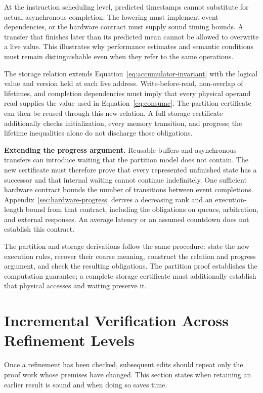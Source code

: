 \documentclass[11pt]{article}
\begin{document}
At the instruction scheduling level, predicted timestamps cannot substitute for actual asynchronous completion. The lowering must implement event dependencies, or the hardware contract must supply sound timing bounds. A transfer that finishes later than its predicted mean cannot be allowed to overwrite a live value. This illustrates why performance estimates and semantic conditions must remain distinguishable even when they refer to the same operations.

The storage relation extends Equation~\ref{eq:accumulator-invariant} with the logical value and version held at each live address. Write-before-read, non-overlap of lifetimes, and completion dependencies must imply that every physical operand read supplies the value used in Equation~\ref{eq:consume}. The partition certificate can then be reused through this new relation. A full storage certificate additionally checks initialization, every memory transition, and progress; the lifetime inequalities alone do not discharge those obligations.

\textbf{Extending the progress argument.}
Reusable buffers and asynchronous transfers can introduce waiting that the partition model does not contain. The new certificate must therefore prove that every represented unfinished state has a successor and that internal waiting cannot continue indefinitely. One sufficient hardware contract bounds the number of transitions between event completions. Appendix~\ref{sec:hardware-progress} derives a decreasing rank and an execution-length bound from that contract, including the obligations on queues, arbitration, and external responses. An average latency or an assumed countdown does not establish this contract.

The partition and storage derivations follow the same procedure: state the new execution rules, recover their coarse meaning, construct the relation and progress argument, and check the resulting obligations. The partition proof establishes the computation guarantee; a complete storage certificate must additionally establish that physical accesses and waiting preserve it.

\section{Incremental Verification Across Refinement Levels}\label{sec:incremental}
Once a refinement has been checked, subsequent edits should repeat only the proof work whose premises have changed. This section states when retaining an earlier result is sound and when doing so saves time.
\end{document}

